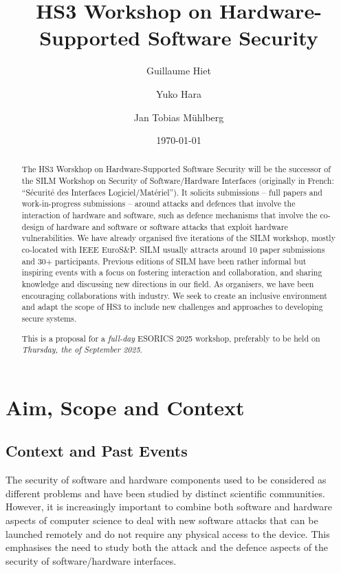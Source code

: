 \documentclass[a4paper,11pt]{article}
\title{HS3 Workshop on Hardware-Supported Software Security}
\date{\today}
\author{Guillaume Hiet}
\affil{CentraleSupélec/Inria, Rennes, France \\
\url{guillaume.hiet@centralesupelec.fr}}
\author{Yuko Hara}
\affil{Institute of Science, Tokyo, Japan\\
\url{hara@cad.ict.e.titech.ac.jp}}
\author{Jan Tobias M\"uhlberg}
\affil{Universit\'e Libre de Bruxelles, Brussels, Belgium \\
\url{jan.tobias.muehlberg@ulb.be}}
\newcommand{\SILMYear}{2025}
\newcommand{\SILMDate}{Thursday, the \nth{25} of September 2025}
\begin{document}
\maketitle

\begin{abstract}
%
The HS3 Worskhop on Hardware-Supported Software Security will be the successor of the 
SILM Workshop on Security of Software/Hardware Interfaces (originally
in French: \enquote{S\'ecurit\'e des Interfaces Logiciel/Mat\'eriel}). It 
solicits submissions -- full papers and work-in-progress submissions --
around attacks and defences that involve the interaction of
hardware and software, such as defence mechanisms that
involve the co-design of hardware and software or software attacks that exploit hardware vulnerabilities. We have already organised
five iterations of the SILM workshop, mostly co-located with IEEE EuroS\&P.
SILM usually attracts around 10 paper submissions and 30+ participants.
Previous editions of SILM have been rather informal but inspiring events
with a focus on fostering interaction and collaboration, and sharing
knowledge and discussing new directions in our field. As organisers, we have
been encouraging collaborations with industry. We seek to create an
inclusive environment and adapt the scope of HS3 to include new
challenges and approaches to developing secure systems.

This is a proposal for a \emph{full-day} ESORICS \SILMYear{}
workshop, preferably to be held on
\emph{\SILMDate}.
%
\end{abstract}

\section{Aim, Scope and Context}
%
\subsection{Context and Past Events}
%
The security of software and hardware components used to be considered as
different problems and have been studied by distinct scientific
communities. However, it is increasingly important to combine both software
and hardware aspects of computer science to deal with new software attacks
that can be launched remotely and do not require any physical access to the
device. This emphasises the need to study both the attack and the defence
aspects of the security of software/hardware interfaces.
\end{document}
